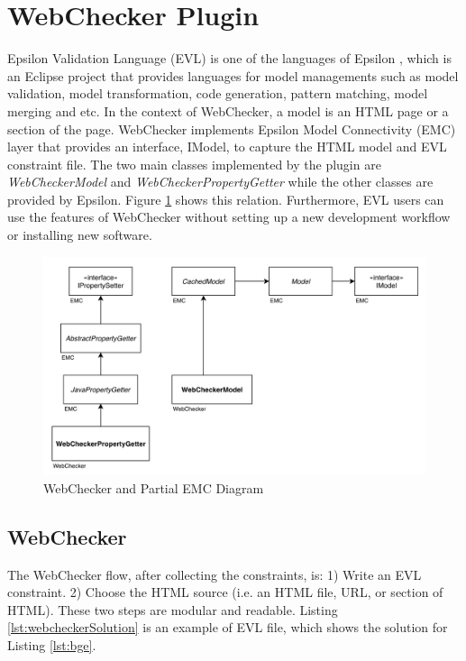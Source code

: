 \documentclass[conference]{IEEETran}
\begin{document}
\section{WebChecker Plugin}
Epsilon Validation Language (EVL) \cite{Kolovos2009} is one of the languages of Epsilon \cite{EpsilonProject}, which is an Eclipse project that provides languages for model managements such as model validation, model transformation, code generation, pattern matching, model merging and etc. In the context of WebChecker, a model is an HTML page or a section of the page. WebChecker implements Epsilon Model Connectivity (EMC) layer that provides an interface, IModel, to capture the HTML model and EVL constraint file. The two main classes implemented by the plugin are \textit{WebCheckerModel} and \textit{WebCheckerPropertyGetter} while the other classes are provided by Epsilon. Figure \ref{fig:webcheckerclass} shows this relation. Furthermore, EVL users can use the features of WebChecker without setting up a new development workflow or installing new software.   


\begin{figure}
  \includegraphics[width=\linewidth]{figures/webchecker-class.png}
  \caption{WebChecker and Partial EMC Diagram}
  \label{fig:webcheckerclass}
\end{figure}

\subsection{WebChecker}
The WebChecker flow, after collecting the constraints, is: 
1) Write an EVL constraint.
2) Choose the HTML source (i.e. an HTML file, URL, or section of HTML).
These two steps are modular and readable. Listing \ref{lst:webcheckerSolution} is an example of EVL file, which shows the solution for Listing \ref{lst:bge}. 
\end{document}
